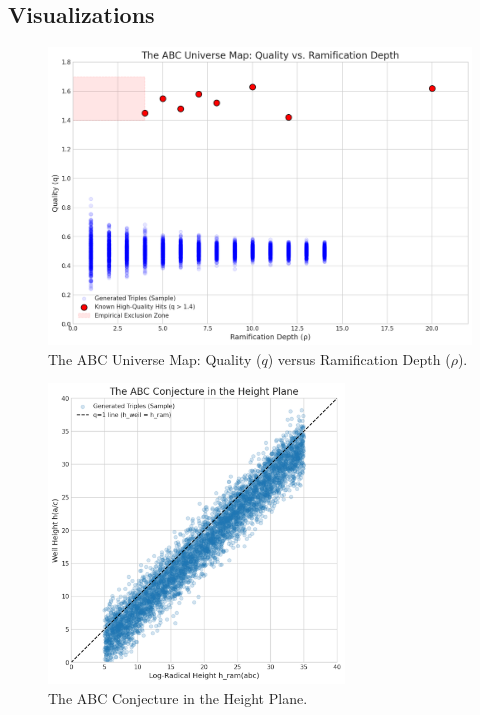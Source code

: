 \documentclass[11pt,a4paper]{article}
\begin{document}
\subsection{Visualizations}
\begin{figure}[h!]
    \centering
    \includegraphics[width=\textwidth]{../figures/quality_vs_rho.png}
    \caption{The ABC Universe Map: Quality ($q$) versus Ramification Depth ($\rho$).}
    \label{fig:quality-rho}
\end{figure}
\begin{figure}[h!]
    \centering
    \includegraphics[width=0.7\textwidth]{../figures/height_plane.png}
    \caption{The ABC Conjecture in the Height Plane.}
    \label{fig:height-plane}
\end{figure}
\end{document}
